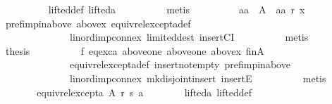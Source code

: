 \begin{isabellebody}
\ \ \ \ \ \ \ \ \isamarkupfalse%
\ lifted{\isacharunderscore}{\kern0pt}def\ lifted{\isacharunderscore}{\kern0pt}a\isanewline
\ \ \ \ \ \ \ \ \isamarkupfalse%
\ metis\isanewline
\ \ \ \ \ \ \isamarkupfalse%
\ \isamarkupfalse%
\ {\isachardoublequoteopen}aa\ {\isasymnotin}\ A\ {\isasymor}\ aa\ {\isasympreceq}\isactrlsub r\ x{\isachardoublequoteclose}\isanewline
\ \ \ \ \ \ \ \ \isamarkupfalse%
\ pref{\isacharunderscore}{\kern0pt}imp{\isacharunderscore}{\kern0pt}in{\isacharunderscore}{\kern0pt}above\ above{\isacharunderscore}{\kern0pt}x\ equiv{\isacharunderscore}{\kern0pt}rel{\isacharunderscore}{\kern0pt}except{\isacharunderscore}{\kern0pt}a{\isacharunderscore}{\kern0pt}def\isanewline
\ \ \ \ \ \ \ \ \ \ \ \ \ \ lin{\isacharunderscore}{\kern0pt}ord{\isacharunderscore}{\kern0pt}imp{\isacharunderscore}{\kern0pt}connex\ limited{\isacharunderscore}{\kern0pt}dest\ insertCI\isanewline
\ \ \ \ \ \ \ \ \isamarkupfalse%
\ metis\isanewline
\ \ \ \ \ \ \isamarkupfalse%
\ {\isacharquery}{\kern0pt}thesis\isanewline
\ \ \ \ \ \ \ \ \isamarkupfalse%
\ f{}\ eq{\isacharunderscore}{\kern0pt}exc{\isacharunderscore}{\kern0pt}a\ above{\isacharunderscore}{\kern0pt}one\ above{\isacharunderscore}{\kern0pt}one{}\ above{\isacharunderscore}{\kern0pt}x\ fin{\isacharunderscore}{\kern0pt}A\isanewline
\ \ \ \ \ \ \ \ \ \ \ \ \ \ equiv{\isacharunderscore}{\kern0pt}rel{\isacharunderscore}{\kern0pt}except{\isacharunderscore}{\kern0pt}a{\isacharunderscore}{\kern0pt}def\ insert{\isacharunderscore}{\kern0pt}not{\isacharunderscore}{\kern0pt}empty\ pref{\isacharunderscore}{\kern0pt}imp{\isacharunderscore}{\kern0pt}in{\isacharunderscore}{\kern0pt}above\isanewline
\ \ \ \ \ \ \ \ \ \ \ \ \ \ lin{\isacharunderscore}{\kern0pt}ord{\isacharunderscore}{\kern0pt}imp{\isacharunderscore}{\kern0pt}connex\ mk{\isacharunderscore}{\kern0pt}disjoint{\isacharunderscore}{\kern0pt}insert\ insertE\isanewline
\ \ \ \ \ \ \ \ \isamarkupfalse%
\ metis\isanewline
\ \ \ \ \isamarkupfalse%
\isanewline
\ \ \ \ \isamarkupfalse%
\ \isamarkupfalse%
\ {\isachardoublequoteopen}equiv{\isacharunderscore}{\kern0pt}rel{\isacharunderscore}{\kern0pt}except{\isacharunderscore}{\kern0pt}a\ A\ r\ s\ a{\isachardoublequoteclose}\isanewline
\ \ \ \ \ \ \isamarkupfalse%
\ lifted{\isacharunderscore}{\kern0pt}a\ lifted{\isacharunderscore}{\kern0pt}def\isanewline
\ \ \ \ \ \ \isamarkupfalse%

\end{isabellebody}
